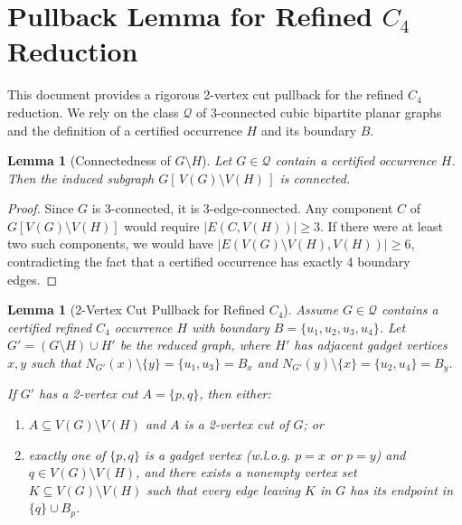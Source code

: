 \documentclass[12pt]{article}
\newtheorem{lemma}[theorem]{Lemma}
\begin{document}
\section*{Pullback Lemma for Refined $C_4$ Reduction}

This document provides a rigorous 2-vertex cut pullback for the refined $C_4$ reduction.
We rely on the class $\mathcal{Q}$ of 3-connected cubic bipartite planar graphs and the definition of a certified occurrence $H$ and its boundary $B$.

\begin{lemma}[Connectedness of $G \setminus H$]
\label{lem:isolated_neighborhood}
Let $G \in \mathcal{Q}$ contain a certified occurrence $H$. Then the induced subgraph $G[\,V(G)\setminus V(H)\,]$ is connected.
\end{lemma}
\begin{proof}
Since $G$ is 3-connected, it is 3-edge-connected. Any component $C$ of $G[V(G)\setminus V(H)]$ would require $|E(C, V(H))| \ge 3$. If there were at least two such components, we would have $|E(V(G)\setminus V(H), V(H))| \ge 6$, contradicting the fact that a certified occurrence has exactly 4 boundary edges.
\end{proof}

\begin{lemma}[2-Vertex Cut Pullback for Refined $C_4$]
\label{lem:pullback_cut_refinedC4}
Assume $G \in \mathcal{Q}$ contains a certified refined $C_4$ occurrence $H$ with boundary $B = \{u_1, u_2, u_3, u_4\}$. Let $G' = (G \setminus H) \cup H'$ be the reduced graph, where $H'$ has adjacent gadget vertices $x, y$ such that $N_{G'}(x) \setminus \{y\} = \{u_1, u_3\} = B_x$ and $N_{G'}(y) \setminus \{x\} = \{u_2, u_4\} = B_y$.

If $G'$ has a 2-vertex cut $A = \{p, q\}$, then either:
\begin{enumerate}
    \item[(i)] $A \subseteq V(G) \setminus V(H)$ and $A$ is a 2-vertex cut of $G$; or
    \item[(ii)] exactly one of $\{p, q\}$ is a gadget vertex (w.l.o.g. $p=x$ or $p=y$) and $q \in V(G) \setminus V(H)$, and there exists a nonempty vertex set $K \subseteq V(G) \setminus V(H)$ such that every edge leaving $K$ in $G$ has its endpoint in $\{q\} \cup B_p$.
\end{enumerate}
\end{lemma}
\end{document}
